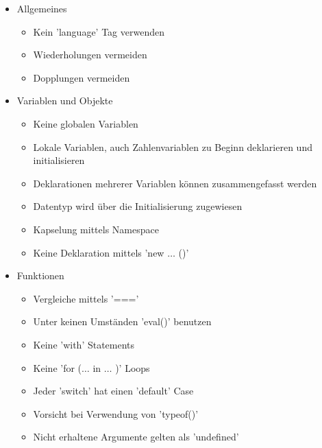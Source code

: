\documentclass[twoside]{report}
\begin{document}
\begin{itemize}
	\item Allgemeines\par

\begin{itemize}
	\item Kein 'language' Tag verwenden\par
	\item Wiederholungen vermeiden\par
	\item Dopplungen vermeiden\par
\end{itemize}

\end{itemize}

\begin{itemize}
	\item Variablen und Objekte\par

\begin{itemize}
	\item Keine globalen Variablen
	\item Lokale Variablen, auch Zahlenvariablen zu Beginn deklarieren und initialisieren\par
	\item Deklarationen mehrerer Variablen können zusammengefasst werden\par
	\item Datentyp wird über die Initialisierung zugewiesen\par
	\item Kapselung mittels Namespace\par
	\item Keine Deklaration mittels 'new $ \ldots $ ()'\par
\end{itemize}

\end{itemize}

\begin{itemize}
	\item Funktionen\par

\begin{itemize}
	\item Vergleiche mittels '==='
	\item Unter keinen Umständen 'eval()' benutzen\par
	\item Keine 'with' Statements\par
	\item Keine 'for ($ \ldots $  in $ \ldots $ )' Loops\par
	\item Jeder 'switch' hat einen 'default' Case\par
	\item Vorsicht bei Verwendung von 'typeof()'\par
	\item Nicht erhaltene Argumente gelten als 'undefined'
\end{itemize}\par

\end{itemize}
\end{document}
